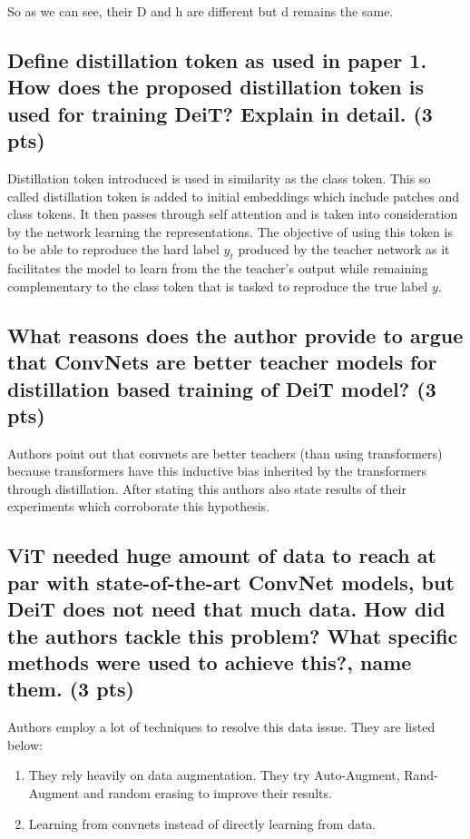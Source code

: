 \documentclass{article}
\begin{document}
So as we can see, their D and h are different but d remains the same.

\subsection{Define distillation token as used in paper 1. How does the proposed distillation token is used for training DeiT? Explain in detail. (3 pts)}

Distillation token introduced is used in similarity as the class token. This so called distillation token is added to initial embeddings which include patches and class tokens. It then passes through self attention and is taken into consideration by the network learning the representations. The objective of using this token is to be able to reproduce the hard label $y_t$ produced by the teacher network as it facilitates the model to learn from the the teacher's output while remaining complementary to the class token that is tasked to reproduce the true label $y$.

\subsection{What reasons does the author provide to argue that ConvNets are better teacher models for distillation based training of DeiT model? (3 pts)}

Authors point out that convnets are better teachers (than using transformers) because transformers have this inductive bias inherited by the transformers through distillation. After stating this authors also state results of their experiments which corroborate this hypothesis.

\subsection{ViT needed huge amount of data to reach at par with state-of-the-art ConvNet models, but DeiT does not need that much data. How did the authors tackle this problem? What specific methods were used  to achieve this?, name them. (3 pts)}

Authors employ a lot of techniques to resolve this data issue. They are listed below:

\begin{enumerate}
    \item They rely heavily on data augmentation. They try Auto-Augment, Rand-Augment and random erasing to improve their results.
    \item Learning from convnets instead of directly learning from data.
    
\end{enumerate}
\end{document}
